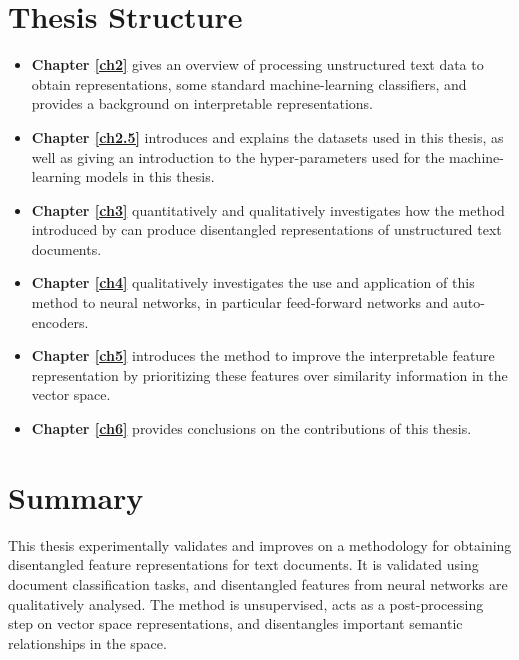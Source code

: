

\section{Thesis Structure}

\begin{itemize}
	\item \textbf{Chapter \ref{ch2}} gives an overview of processing unstructured text data to obtain representations, some standard machine-learning classifiers, and provides a background on interpretable representations.
	\item \textbf{Chapter \ref{ch2.5}} introduces and explains the datasets used in this thesis, as well as giving an introduction to the hyper-parameters  used for the machine-learning models in this thesis.
	\item \textbf{Chapter \ref{ch3}} quantitatively and qualitatively investigates how the method introduced by \cite{Derrac2015} can produce disentangled representations of unstructured text documents.
	\item \textbf{Chapter \ref{ch4}} qualitatively investigates the use and application of this method to neural networks, in particular feed-forward networks and auto-encoders.
	\item \textbf{Chapter \ref{ch5}} introduces the method to improve the interpretable feature representation by prioritizing these features over similarity information in the vector space.
	\item \textbf{Chapter \ref{ch6}} provides conclusions on the contributions of this thesis.
\end{itemize}


\section{Summary}

This thesis experimentally validates and improves on a methodology for obtaining disentangled feature representations for text documents. It is validated using document classification tasks, and disentangled features from neural networks are  qualitatively  analysed. The method is unsupervised, acts as a post-processing step on vector space representations, and  disentangles important semantic relationships in the space.  


